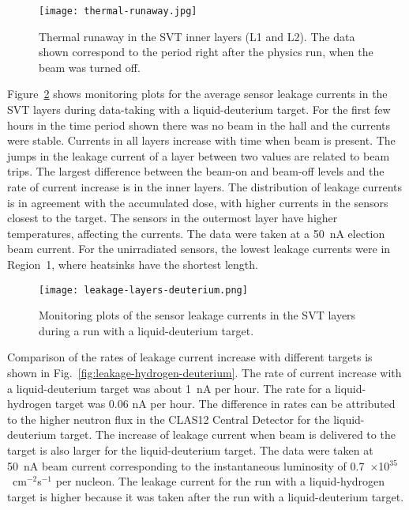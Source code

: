 \begin{figure}[hbt] 
\centering 
\texttt{[image: thermal-runaway.jpg]}
\caption{Thermal runaway in the SVT inner layers (L1 and L2). The data shown correspond to the period right after
  the physics run, when the beam was turned off.}
\label{fig:thermal-runaway}
\end{figure}

Figure~\ref{fig:leakage-layers-deuterium} shows monitoring plots for the average sensor leakage currents in the
SVT layers during data-taking with a liquid-deuterium target. For the first few hours in the time period shown there
was no beam in the hall and the currents were stable. Currents in all layers increase with time when beam is present.
The jumps in the leakage current of a layer between two values are related to beam trips. The largest difference
between the beam-on and beam-off levels and the rate of current increase is in the inner layers. The distribution of
leakage currents is in agreement with the accumulated dose, with higher currents in the sensors closest to the
target. The sensors in the outermost layer have higher temperatures, affecting the currents. The data were taken at
a 50~nA election beam current. For the unirradiated sensors, the lowest leakage currents were in Region~1, where
heatsinks have the shortest length.

\begin{figure}[hbt] 
\centering 
\texttt{[image: leakage-layers-deuterium.png]}
\caption{Monitoring plots of the sensor leakage currents in the SVT layers during a run with a liquid-deuterium
  target.}
\label{fig:leakage-layers-deuterium}
\end{figure}

Comparison of the rates of leakage current increase with different targets is shown in
Fig.~\ref{fig:leakage-hydrogen-deuterium}. The rate of current increase with a liquid-deuterium target was about
1~nA per hour. The rate for a liquid-hydrogen target was 0.06 nA per hour. The difference in rates can be
attributed to the higher neutron flux in the CLAS12 Central Detector for the liquid-deuterium target. The increase
of leakage current when beam is delivered to the target is also larger for the liquid-deuterium target. The data were
taken at 50~nA beam current corresponding to the instantaneous luminosity of
0.7~$\times$10$^{35}$~cm$^{-2}$s$^{-1}$ per nucleon. The leakage current for the run with a liquid-hydrogen target
is higher because it was taken after the run with a liquid-deuterium target.

